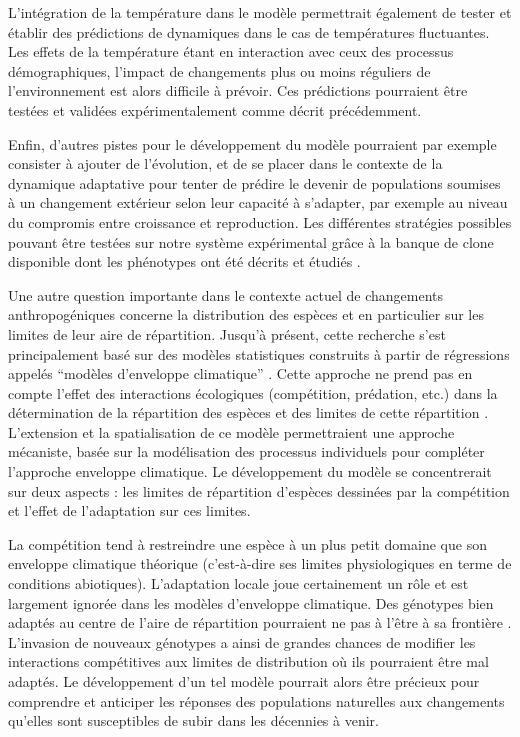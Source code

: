 L'intégration de la température dans le modèle permettrait également de tester
et établir des prédictions de dynamiques dans le cas de températures
fluctuantes. Les effets de la température étant en interaction avec ceux des
processus démographiques, l'impact de changements plus ou moins réguliers de
l'environnement est alors difficile à prévoir. Ces prédictions pourraient être
testées et validées expérimentalement comme décrit précédemment.

Enfin, d'autres pistes pour le développement du modèle pourraient par exemple
consister à ajouter de l'évolution, et de se placer dans le contexte de la
dynamique adaptative pour tenter de prédire le devenir de populations soumises à
un changement extérieur selon leur capacité à s'adapter, par exemple au niveau
du compromis entre croissance et reproduction. Les différentes stratégies
possibles pouvant être testées sur notre système expérimental grâce à la banque
de clone disponible dont les phénotypes ont été décrits et étudiés
\autocites{tully2004a}. 

Une autre question importante dans le contexte actuel de changements
anthropogéniques concerne la distribution des espèces et en particulier sur les
limites de leur aire de répartition. Jusqu’à présent, cette recherche s’est
principalement basé sur des modèles statistiques construits à partir de
régressions appelés ``modèles d’enveloppe climatique''
\autocites{parmesan2006a}. Cette approche ne prend pas en compte l’effet des
interactions écologiques (compétition, prédation, etc.) dans la détermination de
la répartition des espèces et des limites de cette répartition
\autocites{lavergne2010a}. L'extension et la spatialisation de ce modèle
permettraient une approche mécaniste, basée sur la modélisation des processus
individuels pour compléter l’approche enveloppe climatique. Le développement
du modèle se concentrerait sur deux aspects : les limites de répartition
d’espèces dessinées par la compétition et l’effet de l’adaptation sur ces
limites. 

La compétition tend à restreindre une espèce à un plus petit domaine que son
enveloppe climatique théorique (c’est-à-dire ses limites physiologiques en terme
de conditions abiotiques). L’adaptation locale joue certainement un rôle et est
largement ignorée dans les modèles d’enveloppe climatique.
Des génotypes bien adaptés au centre de l’aire de répartition pourraient ne pas
à l’être à sa frontière \autocites{kirkpatrick1997a,case2000a}. L’invasion de
nouveaux génotypes a ainsi de grandes chances de modifier les interactions
compétitives aux limites de distribution où ils pourraient être mal adaptés. Le
développement d'un tel modèle pourrait alors être précieux pour comprendre et
anticiper les réponses des populations naturelles aux changements qu'elles sont
susceptibles de subir dans les décennies à venir.

